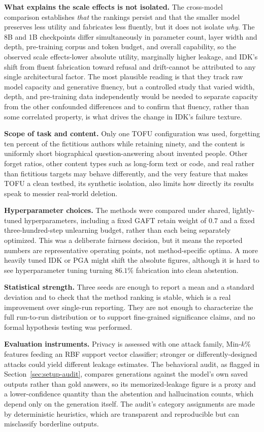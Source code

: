\documentclass[a4paper,12pt]{report}
\begin{document}
\textbf{What explains the scale effects is not isolated.} The cross-model comparison establishes \emph{that} the rankings persist and that the smaller model preserves less utility and fabricates less fluently, but it does not isolate \emph{why}. The 8B and 1B checkpoints differ simultaneously in parameter count, layer width and depth, pre-training corpus and token budget, and overall capability, so the observed scale effects-lower absolute utility, marginally higher leakage, and IDK's shift from fluent fabrication toward refusal and drift-cannot be attributed to any single architectural factor. The most plausible reading is that they track raw model capacity and generative fluency, but a controlled study that varied width, depth, and pre-training data independently would be needed to separate capacity from the other confounded differences and to confirm that fluency, rather than some correlated property, is what drives the change in IDK's failure texture.

\textbf{Scope of task and content.} Only one TOFU configuration was used, forgetting ten percent of the fictitious authors while retaining ninety, and the content is uniformly short biographical question-answering about invented people. Other forget ratios, other content types such as long-form text or code, and real rather than fictitious targets may behave differently, and the very feature that makes TOFU a clean testbed, its synthetic isolation, also limits how directly its results speak to messier real-world deletion.

\textbf{Hyperparameter choices.} The methods were compared under shared, lightly-tuned hyperparameters, including a fixed GAFT retain weight of $0.7$ and a fixed three-hundred-step unlearning budget, rather than each being separately optimized. This was a deliberate fairness decision, but it means the reported numbers are representative operating points, not method-specific optima. A more heavily tuned IDK or PGA might shift the absolute figures, although it is hard to see hyperparameter tuning turning $86.1\%$ fabrication into clean abstention.

\textbf{Statistical strength.} Three seeds are enough to report a mean and a standard deviation and to check that the method ranking is stable, which is a real improvement over single-run reporting. They are not enough to characterize the full run-to-run distribution or to support fine-grained significance claims, and no formal hypothesis testing was performed.

\textbf{Evaluation instruments.} Privacy is assessed with one attack family, Min-$k$\% features feeding an RBF support vector classifier; stronger or differently-designed attacks could yield different leakage estimates. The behavioral audit, as flagged in Section~\ref{sec:setup-audit}, compares generations against the model's own saved outputs rather than gold answers, so its memorized-leakage figure is a proxy and a lower-confidence quantity than the abstention and hallucination counts, which depend only on the generation itself. The audit's category assignments are made by deterministic heuristics, which are transparent and reproducible but can misclassify borderline outputs.
\end{document}
